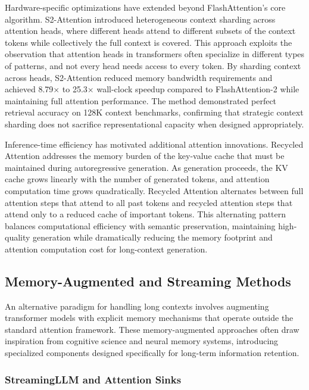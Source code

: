 \documentclass[11pt,letterpaper]{article}
\begin{document}
Hardware-specific optimizations have extended beyond FlashAttention's core algorithm. S2-Attention introduced heterogeneous context sharding across attention heads, where different heads attend to different subsets of the context tokens while collectively the full context is covered. This approach exploits the observation that attention heads in transformers often specialize in different types of patterns, and not every head needs access to every token. By sharding context across heads, S2-Attention reduced memory bandwidth requirements and achieved 8.79$\times$ to 25.3$\times$ wall-clock speedup compared to FlashAttention-2 while maintaining full attention performance. The method demonstrated perfect retrieval accuracy on 128K context benchmarks, confirming that strategic context sharding does not sacrifice representational capacity when designed appropriately.

Inference-time efficiency has motivated additional attention innovations. Recycled Attention addresses the memory burden of the key-value cache that must be maintained during autoregressive generation. As generation proceeds, the KV cache grows linearly with the number of generated tokens, and attention computation time grows quadratically. Recycled Attention alternates between full attention steps that attend to all past tokens and recycled attention steps that attend only to a reduced cache of important tokens. This alternating pattern balances computational efficiency with semantic preservation, maintaining high-quality generation while dramatically reducing the memory footprint and attention computation cost for long-context generation.

\subsection{Memory-Augmented and Streaming Methods}

An alternative paradigm for handling long contexts involves augmenting transformer models with explicit memory mechanisms that operate outside the standard attention framework. These memory-augmented approaches often draw inspiration from cognitive science and neural memory systems, introducing specialized components designed specifically for long-term information retention.

\subsubsection{StreamingLLM and Attention Sinks}
\end{document}
